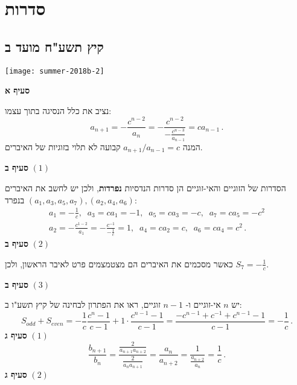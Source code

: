 

\chapter{סדרות}



\section{קיץ תשע"ח מועד ב}

\begin{center}
\texttt{[image: summer-2018b-2]}
\end{center}
\vspace{-1ex}

\textbf{סעיף א}

נציב את כלל הנסיגה בתוך עצמו:
\[
a_{n+1} = -\frac{c^{n-2}}{a_n} = -\frac{c^{n-2}}{\displaystyle -\frac{c^{n-3}}{a_{n-1}}} = ca_{n-1}\,.
\]
המנה
$a_{n+1}/a_{n-1}=c$
קבועה לא תלוי בזוגיות של האיברים.

\textbf{סעיף ב}
$(1)$

הסדרות של הזוגיים והאי-זוגיים הן סדרות הנדסיות
\textbf{נפרדות},
ולכן יש לחשב את האיברים
$(a_1,a_3,a_5,a_7), (a_2,a_4,a_6)$
בנפרד:
\[
\renewcommand{\arraystretch}{2}
\begin{array}{l}
a_1=-\displaystyle\frac{1}{c},\;\;a_3=ca_1=-1,\;\;a_5=ca_3=-c,\;\;a_7=ca_5=-c^2\\
a_2=\displaystyle
-\frac{c^{1-2}}{a_1}=
-\frac{c^{-1}}{-\frac{1}{c}}=1,\;\;a_4=ca_2=c,\;\;a_6=ca_4=c^2\,.
\end{array}
\]
\textbf{סעיף ב}
$(2)$

כאשר מסכמים את האיברים הם מצטמצמים פרט לאיבר הראשון, ולכן
$S_7=-\frac{1}{c}$.

\newpage

\textbf{סעיף ב}
$(3)$

יש 
$n$ 
אי-זוגיים ו-%
$n-1$
זוגיים, ראו את הפתרון לבחינה של קיץ תשע"ו ב:
\[
S_{\mathit{odd}}+S_{\mathit{even}}=-\frac{1}{c}\frac{c^n-1}{c-1}+ 1\cdot\frac{c^{n-1}-1}{c-1}= \frac{-c^{n-1}+c^{-1} + c^{n-1}-1}{c-1}= -\frac{1}{c}\,.
\]
\textbf{סעיף ג}
$(1)$
\[
\frac{b_{n+1}}{b_n} = \frac{\displaystyle\frac{2}{a_{n+1}a_{n+2}}}{\displaystyle\frac{2}{a_{n}a_{n+1}}}= \frac{a_n}{a_{n+2}} =  \frac{1}{\displaystyle\frac{a_{n+2}}{a_n}} = \frac{1}{c}\,.
\]
\textbf{סעיף ג}
$(2)$

